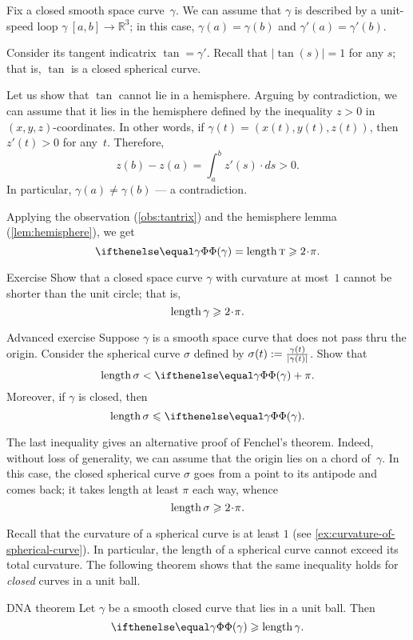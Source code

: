Fix a closed smooth space curve~$\gamma$.
We can assume that $\gamma$ is described by a unit-speed loop $\gamma\:[a,b]\to \mathbb{R}^3$;
in this case, $\gamma(a)=\gamma(b)$ and $\gamma'(a)=\gamma'(b)$.

Consider its tangent indicatrix $\tan=\gamma'$.
Recall that $|\tan(s)|=1$ for any $s$; that is, $\tan$ is a closed spherical curve.

Let us show that $\tan$ cannot lie in a hemisphere.
Arguing by contradiction, we can assume that it lies in the hemisphere defined by the inequality $z>0$ in $(x,y,z)$-coordinates.
In other words, if $\gamma(t)=(x(t), y(t), z(t))$, then $z'(t)>0$ for any~$t$.
Therefore,
\[z(b)-z(a)=\int_a^b z'(s)\cdot ds>0.\]
In particular, $\gamma(a)\ne \gamma(b)$ --- a contradiction.

Applying the observation (\ref{obs:tantrix}) and the hemisphere lemma (\ref{lem:hemisphere}), we get  
\[\tc\gamma=\length \tan\ge2\cdot\pi.\]
\qedsf

\begin{thm}{Exercise}\label{ex:length>=2pi}
Show that a closed space curve $\gamma$ with curvature at most~$1$ cannot be shorter than the unit circle;
that is, 
\[\length\gamma\ge 2\cdot \pi.\]

\end{thm}


\begin{thm}{Advanced exercise}\label{ex:gamma/|gamma|}
Suppose $\gamma$ is a smooth space curve that does not pass thru the origin.
Consider the spherical curve $\sigma$ defined by $\sigma(t)\z\df\frac{\gamma(t)}{|\gamma(t)|}$.
Show that 
\[\length \sigma< \tc\gamma+\pi.\]
Moreover, if $\gamma$ is closed, then
\[\length \sigma\le \tc\gamma.\]
\end{thm}

The last inequality gives an alternative proof of Fenchel's theorem.
Indeed, without loss of generality, we can assume that the origin lies on a chord of~$\gamma$.
In this case, the closed spherical curve $\sigma$ goes from a point to its antipode and comes back; 
it takes length at least $\pi$ each way, 
whence 
\[\length\sigma\ge 2\cdot\pi.\]

Recall that the curvature of a spherical curve is at least $1$
(see \ref{ex:curvature-of-spherical-curve}).
In particular, the length of a spherical curve cannot exceed its total curvature.
The following theorem shows that the same inequality holds for \textit{closed} curves in a unit ball.

\begin{thm}{DNA theorem}\label{thm:DNA}
Let $\gamma$ be a smooth closed curve that lies in a unit ball.
Then 
\[\tc\gamma\ge \length\gamma.\]

\end{thm}

